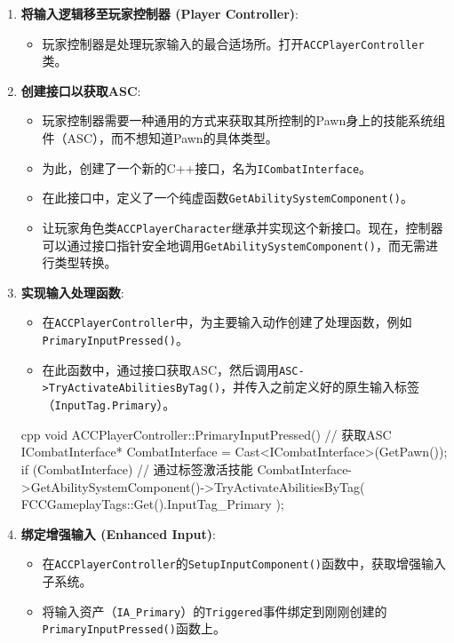 \documentclass[10pt,CJKmath]{zhbook-v1}
\begin{document}
\begin{enumerate}
    \item \textbf{将输入逻辑移至玩家控制器 (Player Controller)}:
    \begin{itemize}
        \item 玩家控制器是处理玩家输入的最合适场所。打开\texttt{ACCPlayerController}类。
    \end{itemize}

    \item \textbf{创建接口以获取ASC}:
    \begin{itemize}
        \item 玩家控制器需要一种通用的方式来获取其所控制的Pawn身上的技能系统组件（ASC），而不想知道Pawn的具体类型。
        \item 为此，创建了一个新的C++接口，名为\texttt{ICombatInterface}。
        \item 在此接口中，定义了一个纯虚函数\texttt{GetAbilitySystemComponent()}。
        \item 让玩家角色类\texttt{ACCPlayerCharacter}继承并实现这个新接口。现在，控制器可以通过接口指针安全地调用\texttt{GetAbilitySystemComponent()}，而无需进行类型转换。
    \end{itemize}

    \item \textbf{实现输入处理函数}:
    \begin{itemize}
        \item 在\texttt{ACCPlayerController}中，为主要输入动作创建了处理函数，例如\texttt{PrimaryInputPressed()}。
        \item 在此函数中，通过接口获取ASC，然后调用\texttt{ASC->TryActivateAbilitiesByTag()}，并传入之前定义好的原生输入标签（\texttt{InputTag.Primary}）。
    \end{itemize}
    \begin{amzcode}{cpp}
    void ACCPlayerController::PrimaryInputPressed()
    {
        // 获取ASC
        ICombatInterface* CombatInterface = Cast<ICombatInterface>(GetPawn());
        if (CombatInterface)
        {
            // 通过标签激活技能
            CombatInterface->GetAbilitySystemComponent()->TryActivateAbilitiesByTag(
                FCCGameplayTags::Get().InputTag_Primary
            );
        }
    }
    \end{amzcode}

    \item \textbf{绑定增强输入 (Enhanced Input)}:
    \begin{itemize}
        \item 在\texttt{ACCPlayerController}的\texttt{SetupInputComponent()}函数中，获取增强输入子系统。
        \item 将输入资产（\texttt{IA\_Primary}）的\texttt{Triggered}事件绑定到刚刚创建的\texttt{PrimaryInputPressed()}函数上。
    \end{itemize}


\end{enumerate}
\end{document}
